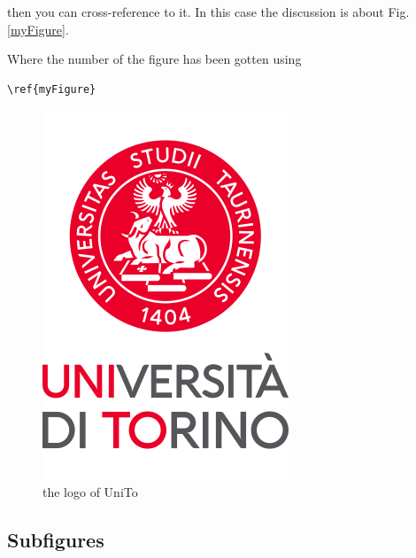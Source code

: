 then you can cross-reference to it. In this case the discussion is about Fig. \ref{myFigure}.

Where the number of the figure has been gotten using
\begin{verbatim} 
\ref{myFigure}
\end{verbatim}


\begin{figure}[htb]
	\centering

	\includegraphics[scale=0.15]{pictures/logo.png}
	\caption{the logo of UniTo}

\end{figure}

\subsection{Subfigures}

